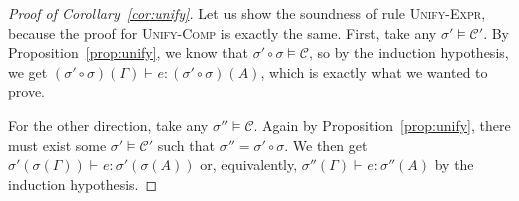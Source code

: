 \documentclass{LMCS}
\newcommand{\rulename}[1]{{\mdseries \small \textsc{#1}}}
\newcommand{\ctx}{\Gamma}
\newcommand{\ent}[1][]{\vdash_{#1}}
\newcommand{\T}{\mathrel{:}}
\newcommand{\cstr}{\mathcal{C}}
\newcommand{\sol}{\sigma}
\begin{document}
\begin{proof}[Proof of Corollary~\ref{cor:unify}]
Let us show the soundness of rule \rulename{Unify-Expr}, because the proof for \rulename{Unify-Comp} is exactly the same.
First, take any $\sol' \models \cstr'$.
By Proposition~\ref{prop:unify}, we know that $\sol' \circ \sol \models \cstr$,
so by the induction hypothesis, we get $(\sol' \circ \sol)(\ctx) \ent e \T (\sol' \circ \sol)(A)$,
which is exactly what we wanted to prove.

For the other direction, take any $\sol'' \models \cstr$.
Again by Proposition~\ref{prop:unify}, there must exist some $\sol' \models \cstr'$
such that $\sol'' = \sol' \circ \sol$.
We then get $\sol'(\sol(\ctx)) \ent e \T \sol'(\sol(A))$ or, equivalently,
$\sol''(\ctx) \ent e \T \sol''(A)$ by the induction hypothesis.
\end{proof}
\end{document}
